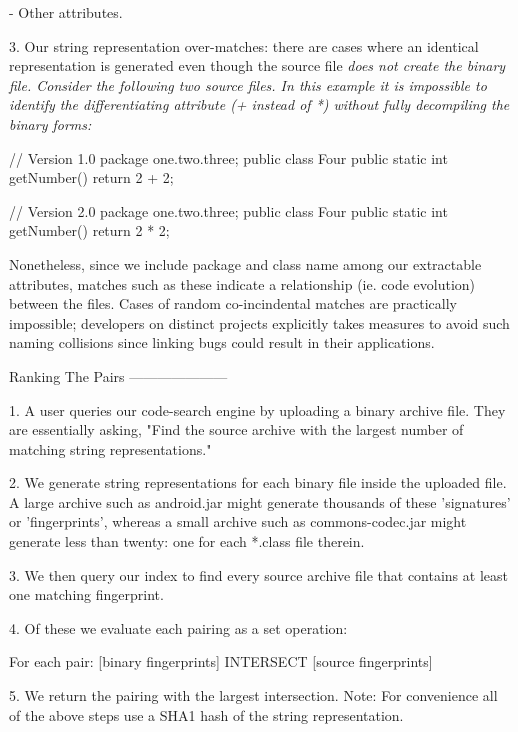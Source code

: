       - Other attributes.

3.  Our string representation over-matches:  there are cases where an
    identical representation is generated even though the source file
    \em{does not} create the binary file.  Consider the following two
    source files. In this example it is impossible to identify the
    differentiating attribute (+ instead of *) without fully decompiling
    the binary forms:

    // Version 1.0
    package one.two.three;
    public class Four {
      public static int getNumber() { return 2 + 2; }
    }

    // Version 2.0
    package one.two.three;
    public class Four {
      public static int getNumber() { return 2 * 2; }
    }

    Nonetheless, since we include package and class name among our extractable
    attributes, matches such as these indicate a relationship (ie. code
    evolution) between the files.  Cases of random co-incindental matches are
    practically impossible; developers on distinct projects explicitly takes
    measures to avoid such naming collisions since linking bugs could result in
    their applications.


Ranking The Pairs
---------------------

1.  A user queries our code-search engine by uploading a binary archive file.
    They are essentially asking, "Find the source archive with the largest
    number of matching string representations."

2.  We generate string representations for each binary file inside the uploaded
    file.  A large archive such as android.jar might generate thousands of
    these 'signatures' or 'fingerprints', whereas a small archive such as
    commons-codec.jar might generate less than twenty:  one for each *.class
    file therein.

3.  We then query our index to find every source archive file that contains at
    least one matching fingerprint.

4.  Of these we evaluate each pairing as a set operation:

    For each pair:
      [binary fingerprints]  INTERSECT  [source fingerprints]

5.  We return the pairing with the largest intersection.
    Note:  For convenience all of the above steps use a SHA1 hash of the
    string representation.


